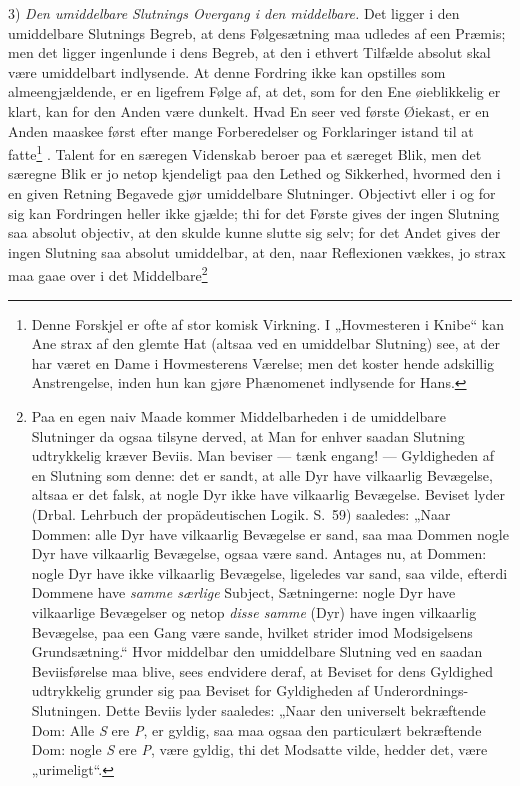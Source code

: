 \documentclass[12pt]{book}
\begin{document}
3) \emph{Den umiddelbare Slutnings Overgang i den middelbare.} Det ligger i den umiddelbare Slutnings Begreb, at dens Følgesætning maa udledes af een Præmis; men det ligger ingenlunde i dens Begreb, at den i ethvert Tilfælde absolut skal være umiddelbart indlysende. At denne Fordring ikke kan opstilles som almeengjældende, er en ligefrem Følge af, at det, som for den Ene øieblikkelig er klart, kan for den Anden være dunkelt. Hvad En seer ved første Øiekast, er en Anden maaskee først efter mange Forberedelser og Forklaringer istand til at fatte\footnote{Denne Forskjel er ofte af stor komisk Virkning. I „Hovmesteren i Knibe“ kan Ane strax af den glemte Hat (altsaa ved en umiddelbar Slutning) see, at der har været en Dame i Hovmesterens Værelse; men det koster hende adskillig Anstrengelse, inden hun kan gjøre Phænomenet indlysende for Hans.}%
. Talent for en særegen Videnskab beroer paa et særeget Blik, men det særegne Blik er jo netop kjendeligt paa den Lethed og Sikkerhed, hvormed den i en given Retning Begavede gjør umiddelbare Slutninger. Objectivt eller i og for sig kan Fordringen heller ikke gjælde; thi for det Første gives der ingen Slutning saa absolut objectiv, at den skulde kunne slutte sig selv; for det Andet gives der ingen Slutning saa absolut umiddelbar, at den, naar Reflexionen vækkes, jo strax maa gaae over i det Middelbare\footnote{Paa en egen naiv Maade kommer Middelbarheden i de umiddelbare Slutninger da ogsaa tilsyne derved, at Man for enhver saadan Slutning udtrykkelig kræver Beviis. Man beviser --- tænk engang! --- Gyldigheden af en Slutning som denne: det er sandt, at alle Dyr have vilkaarlig Bevægelse, altsaa er det falsk, at nogle %
Dyr ikke have vilkaarlig Bevægelse. Beviset lyder (Drbal. Lehrbuch der propädeutischen Logik. S.~59) saaledes: „Naar Dommen: alle Dyr have vilkaarlig Bevægelse er sand, saa maa Dommen nogle Dyr have vilkaarlig Bevægelse, ogsaa være sand. Antages nu, at Dommen: nogle Dyr have ikke vilkaarlig Bevægelse, ligeledes var sand, saa vilde, efterdi Dommene have \emph{samme særlige} Subject, Sætningerne: nogle Dyr have vilkaarlige Bevægelser og netop \emph{disse samme} (Dyr) have ingen vilkaarlig Bevægelse, paa een Gang være sande, hvilket strider imod Modsigelsens Grundsætning.“ Hvor middelbar den umiddelbare Slutning ved en saadan Beviisførelse maa blive, sees endvidere deraf, at Beviset for dens Gyldighed udtrykkelig grunder sig paa Beviset for Gyldigheden af Underordnings-Slutningen. Dette Beviis lyder saaledes: „Naar den universelt bekræftende Dom: Alle \textit{S} ere \textit{P}, er gyldig, saa maa ogsaa den particulært bekræftende Dom: nogle \textit{S} ere \textit{P}, være gyldig, thi det Modsatte vilde, hedder det, være „urimeligt“.%
}
\end{document}
